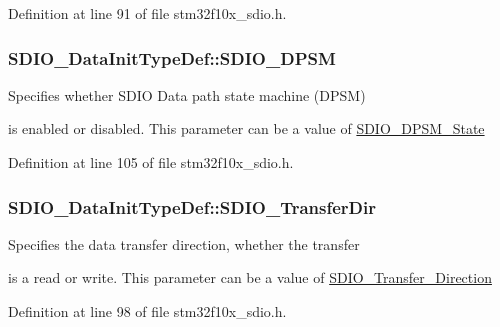 Definition at line 91 of file stm32f10x\-\_\-sdio.\-h.

\hypertarget{struct_s_d_i_o___data_init_type_def_ad5eb5f3c6fd9e5d4a6664c5cf57d6b03}{
\subsubsection[{S\-D\-I\-O\-\_\-\-D\-P\-S\-M}]{ S\-D\-I\-O\-\_\-\-Data\-Init\-Type\-Def\-::\-S\-D\-I\-O\-\_\-\-D\-P\-S\-M}}\label{struct_s_d_i_o___data_init_type_def_ad5eb5f3c6fd9e5d4a6664c5cf57d6b03}
\begin{DoxyVerb}           Specifies whether SDIO Data path state machine (DPSM)
\end{DoxyVerb}
 is enabled or disabled. This parameter can be a value of \hyperlink{group___s_d_i_o___d_p_s_m___state}{S\-D\-I\-O\-\_\-\-D\-P\-S\-M\-\_\-\-State} 

Definition at line 105 of file stm32f10x\-\_\-sdio.\-h.

\hypertarget{struct_s_d_i_o___data_init_type_def_a4838fffdb3f87850569dff12f15485db}{
\subsubsection[{S\-D\-I\-O\-\_\-\-Transfer\-Dir}]{ S\-D\-I\-O\-\_\-\-Data\-Init\-Type\-Def\-::\-S\-D\-I\-O\-\_\-\-Transfer\-Dir}}\label{struct_s_d_i_o___data_init_type_def_a4838fffdb3f87850569dff12f15485db}
\begin{DoxyVerb}    Specifies the data transfer direction, whether the transfer
\end{DoxyVerb}
 is a read or write. This parameter can be a value of \hyperlink{group___s_d_i_o___transfer___direction}{S\-D\-I\-O\-\_\-\-Transfer\-\_\-\-Direction} 

Definition at line 98 of file stm32f10x\-\_\-sdio.\-h.

